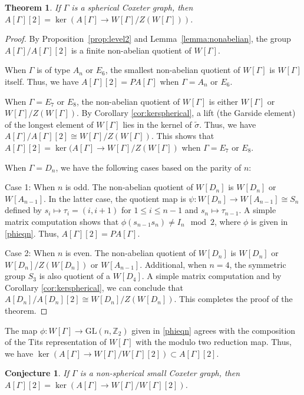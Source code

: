 \documentclass[12pt]{amsart}
\newtheorem{theorem}[equation]{Theorem}
\newtheorem{conjecture}[equation]{Conjecture}
\theoremstyle{definition}
\numberwithin{equation}{section}
\newcommand{\GL}{\mathrm{GL}}
\begin{document}
\begin{theorem}\label{thm:level2}
If $\Gamma$ is a spherical Coxeter graph, then $A[\Gamma][2]=\ker(A[\Gamma]\to W[\Gamma]/Z(W[\Gamma]))$.
\end{theorem}
\begin{proof}
By Proposition~\ref{prop:level2} and Lemma~\ref{lemma:nonabelian}, the group $A[\Gamma]/A[\Gamma][2]$ is a finite non-abelian quotient of $W[\Gamma]$.

 When $\Gamma$ is of type $A_n$ or $E_6$, the smallest non-abelian quotient of $W[\Gamma]$ is $W[\Gamma]$ itself. Thus, we have $A[\Gamma][2]=PA[\Gamma]$ when $\Gamma=A_n$ or $E_6$. 

When $\Gamma=E_7$ or $E_8$, the non-abelian quotient of $W[\Gamma]$ is either $W[\Gamma]$ or $W[\Gamma]/Z(W[\Gamma])$. By Corollary \ref{cor:kerspherical}, a lift (the Garside element) of the longest element of $W[\Gamma]$  lies in the kernel of $\tilde{\sigma}$.  Thus, we have $A[\Gamma]/A[\Gamma][2]\cong W[\Gamma]/Z(W[\Gamma])$. This shows that $A[\Gamma][2]=\ker(A[\Gamma]\to W[\Gamma]/Z(W[\Gamma])$ when $\Gamma=E_7$ or $E_8$.

 When $\Gamma=D_n$, we have the following cases based on the parity of $n$:
\par
Case 1: When $n$ is odd.
The non-abelian quotient of $W[D_n]$ is $W[D_n]$ or $W[A_{n-1}]$. In the latter case, the quotient map is $\psi:W[D_n] \to W[{A_{n-1}}]\cong S_n$ defined by $s_{i} \mapsto \tau_i=(i, i+1)$ for $ 1 \leq i \leq n-1$ and $s_n \mapsto \tau_{n-1}$. A simple matrix computation shows that $\phi(s_{n-1}s_{n}) \neq I_n \mod 2$, where $\phi$ is given in \eqref{phieqn}. Thus, $A[\Gamma][2]=PA[\Gamma]$.
\par
Case 2: When $n$ is even.
The non-abelian quotient of $W[D_n]$ is $W[D_n]$ or $W[D_n]/Z(W[D_n])$ or $W[A_{n-1}]$. Additional, when $n=4$, the symmetric group $S_3$ is  also quotient of a $W[D_4]$. A simple matrix computation and by Corollary \ref{cor:kerspherical}, we can conclude that $A[D_n]/A[D_n][2]\cong W[D_n]/Z(W[D_n])$.  This completes the proof of the theorem.
\end{proof}

The map $\phi:W[\Gamma]\to \GL(n, \mathbb Z_2)$ given in \eqref{phieqn} agrees with the composition of the Tits representation of $W[\Gamma]$ with the modulo two reduction map. Thus, we have  $\ker(A[\Gamma]\to W[\Gamma]/W[\Gamma][2])\subset A[\Gamma][2]$. 


\begin{conjecture}
If $\Gamma$ is a non-spherical small Coxeter graph, then $A[\Gamma][2]=\ker(A[\Gamma]\to W[\Gamma]/W[\Gamma][2])$.
\end{conjecture}
\end{document}

